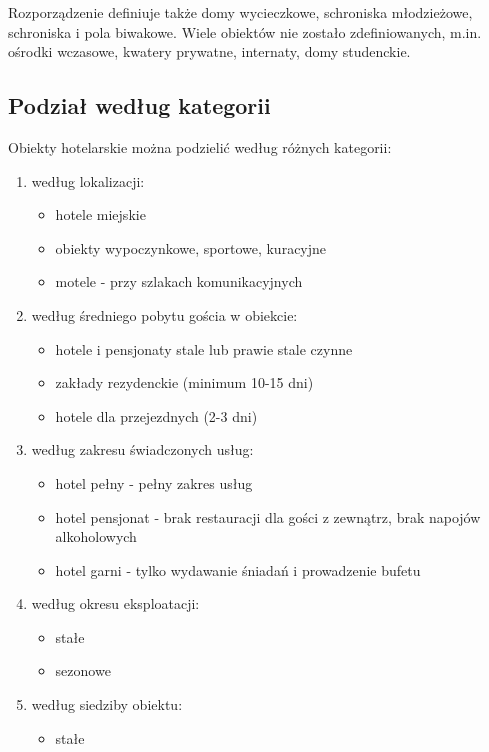 \documentclass[a4paper,onecolumn,oneside,11pt,wide,floatssmall]{mwrep}
\theoremstyle{definition}
\theoremstyle{plain}%
\theoremstyle{remark}
\begin{document}
Rozporządzenie definiuje także domy wycieczkowe, schroniska młodzieżowe, 
schroniska i pola biwakowe. Wiele obiektów nie zostało zdefiniowanych, m.in. 
ośrodki wczasowe, kwatery prywatne, internaty, domy studenckie.


\subsection{Podział według kategorii} 
Obiekty hotelarskie można podzielić według różnych kategorii\cite[15-16]{
KlasKatZakHot}:

\begin{enumerate}
  \item według lokalizacji:
    \begin{itemize}
      \item hotele miejskie
      \item obiekty wypoczynkowe, sportowe, kuracyjne
      \item motele - przy szlakach komunikacyjnych
    \end{itemize}
  \item według średniego pobytu gościa w obiekcie:
    \begin{itemize}
      \item hotele i pensjonaty stale lub prawie stale czynne
      \item zakłady rezydenckie (minimum 10-15 dni)
      \item hotele dla przejezdnych (2-3 dni)
    \end{itemize}
  \item według zakresu świadczonych usług:
    \begin{itemize}
      \item hotel pełny - pełny zakres usług
      \item hotel pensjonat - brak restauracji dla gości z zewnątrz, brak 
      napojów alkoholowych
      \item hotel garni - tylko wydawanie śniadań i prowadzenie bufetu
    \end{itemize}
  \item według okresu eksploatacji:
    \begin{itemize}
      \item stałe
      \item sezonowe
    \end{itemize}
  \item według siedziby obiektu:
    \begin{itemize}
      \item stałe

\end{itemize}
\end{enumerate}
\end{document}
